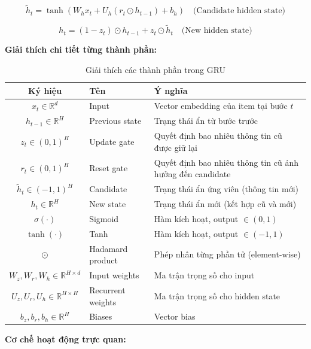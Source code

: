 \documentclass[12pt, a4paper]{article}
\begin{document}
\begin{equation}
\boxed{
    \tilde{h}_t = \tanh(W_h x_t + U_h (r_t \odot h_{t-1}) + b_h)
}
\quad \text{(Candidate hidden state)}
\label{eq:gru_candidate}
\end{equation}

\begin{equation}
\boxed{
    h_t = (1 - z_t) \odot h_{t-1} + z_t \odot \tilde{h}_t
}
\quad \text{(New hidden state)}
\label{eq:gru_state}
\end{equation}

\textbf{Giải thích chi tiết từng thành phần:}

\begin{table}[H]
\centering
\caption{Giải thích các thành phần trong GRU}
\label{tab:gru_components}
\begin{tabular}{clp{7cm}}
\toprule
\textbf{Ký hiệu} & \textbf{Tên} & \textbf{Ý nghĩa} \\
\midrule
$x_t \in \mathbb{R}^d$ & Input & Vector embedding của item tại bước $t$ \\
$h_{t-1} \in \mathbb{R}^H$ & Previous state & Trạng thái ẩn từ bước trước \\
$z_t \in (0,1)^H$ & Update gate & Quyết định bao nhiêu thông tin cũ được giữ lại \\
$r_t \in (0,1)^H$ & Reset gate & Quyết định bao nhiêu thông tin cũ ảnh hưởng đến candidate \\
$\tilde{h}_t \in (-1,1)^H$ & Candidate & Trạng thái ẩn ứng viên (thông tin mới) \\
$h_t \in \mathbb{R}^H$ & New state & Trạng thái ẩn mới (kết hợp cũ và mới) \\
$\sigma(\cdot)$ & Sigmoid & Hàm kích hoạt, output $\in (0,1)$ \\
$\tanh(\cdot)$ & Tanh & Hàm kích hoạt, output $\in (-1,1)$ \\
$\odot$ & Hadamard product & Phép nhân từng phần tử (element-wise) \\
$W_z, W_r, W_h \in \mathbb{R}^{H \times d}$ & Input weights & Ma trận trọng số cho input \\
$U_z, U_r, U_h \in \mathbb{R}^{H \times H}$ & Recurrent weights & Ma trận trọng số cho hidden state \\
$b_z, b_r, b_h \in \mathbb{R}^H$ & Biases & Vector bias \\
\bottomrule
\end{tabular}
\end{table}

\textbf{Cơ chế hoạt động trực quan:}
\end{document}
